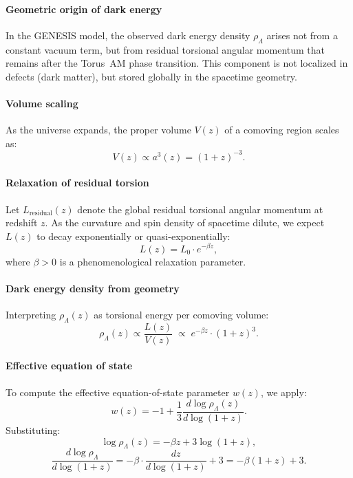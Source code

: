 \documentclass{article}
\begin{document}
\paragraph{Geometric origin of dark energy}
In the GENESIS model, the observed dark energy density $\rho_\Lambda$ arises not from a constant vacuum term, but from residual torsional angular momentum that remains after the Torus~AM phase transition. This component is not localized in defects (dark matter), but stored globally in the spacetime geometry.

\paragraph{Volume scaling}
As the universe expands, the proper volume $V(z)$ of a comoving region scales as:
\begin{equation}\label{eq:auto227}
V(z) \propto a^3(z) = (1 + z)^{-3}.
\end{equation}

\paragraph{Relaxation of residual torsion}
Let $L_{\text{residual}}(z)$ denote the global residual torsional angular momentum at redshift $z$. As the curvature and spin density of spacetime dilute, we expect $L(z)$ to decay exponentially or quasi-exponentially:
\begin{equation}\label{eq:auto228}
L(z) = L_0 \cdot e^{-\beta z},
\end{equation}
where $\beta > 0$ is a phenomenological relaxation parameter.

\paragraph{Dark energy density from geometry}
Interpreting $\rho_\Lambda(z)$ as torsional energy per comoving volume:
\begin{equation}\label{eq:auto229}
\rho_\Lambda(z)
  \propto
  \frac{L(z)}{V(z)} \;\propto\;
  e^{-\beta z}\cdot(1+z)^3.
\end{equation}

\paragraph{Effective equation of state}
To compute the effective equation-of-state parameter \( w(z) \), we apply:
\begin{equation}\label{eq:auto230}
w(z) = -1 + \frac{1}{3}\frac{d\log\rho_\Lambda(z)}{d\log(1+z)}.
\end{equation}
Substituting:
\begin{equation}\label{eq:auto231}
\log\rho_\Lambda(z)
  = -\beta z + 3\log(1+z),
\end{equation}
\begin{equation}\label{eq:auto232}
\frac{d\log\rho_\Lambda}{d\log(1+z)}
  = -\beta \cdot \frac{dz}{d\log(1+z)} + 3
  = -\beta (1+z) + 3.
\end{equation}
\end{document}
